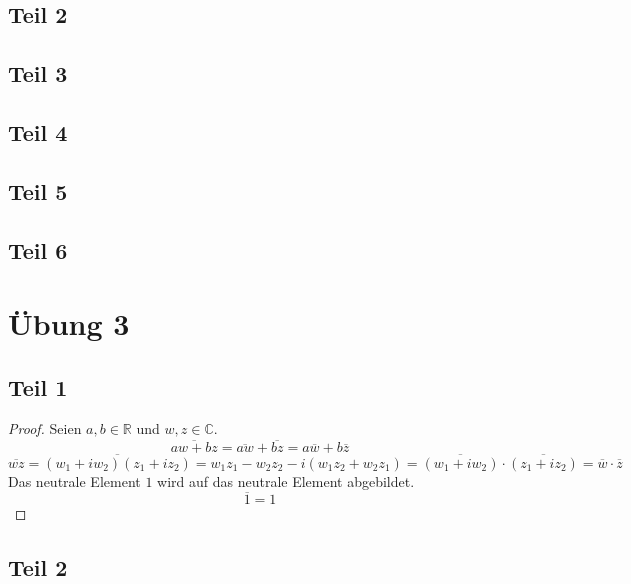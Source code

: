 \documentclass[10pt,a4paper]{article}
\begin{document}
\subsection*{Teil 2}

\subsection*{Teil 3}

\subsection*{Teil 4}

\subsection*{Teil 5}

\subsection*{Teil 6}

\section*{Übung 3}

\subsection*{Teil 1}

\begin{proof}
Seien $a, b \in \mathbb{R}$ und $w, z \in \mathbb{C}$.
\begin{equation}
\overline{aw + bz} = \overline{aw} + \overline{bz} = a\overline{w} + b\overline{z}
\end{equation}
\begin{equation}
\overline{wz} = \overline{(w_{1} + iw_{2})(z_{1} + iz_{2})} = w_{1}z_{1} - w_{2}z_{2} - i(w_{1}z_{2} + w_{2}z_{1}) = \overline{(w_{1} + iw_{2})} \cdot \overline{(z_{1} + iz_{2})} = \overline{w} \cdot \overline{z}
\end{equation}
Das neutrale Element $1$ wird auf das neutrale Element abgebildet.
\begin{equation}
\overline{1} = 1
\end{equation}
\end{proof}

\subsection*{Teil 2}
\end{document}
